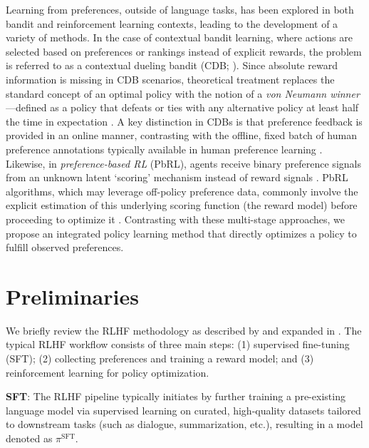 Learning from preferences, outside of language tasks, has been explored in both bandit and reinforcement learning contexts, leading to the development of a variety of methods. In the case of contextual bandit learning, where actions are selected based on preferences or rankings instead of explicit rewards, the problem is referred to as a contextual dueling bandit (CDB; \cite{yue2012karmed,dudik2015contextual}). Since absolute reward information is missing in CDB scenarios, theoretical treatment replaces the standard concept of an optimal policy with the notion of a \textit{von Neumann winner}—defined as a policy that defeats or ties with any alternative policy at least half the time in expectation \citep{dudik2015contextual}. A key distinction in CDBs is that preference feedback is provided in an online manner, contrasting with the offline, fixed batch of human preference annotations typically available in human preference learning \citep{yan2022human}. Likewise, in \textit{preference-based RL} (PbRL), agents receive binary preference signals from an unknown latent `scoring' mechanism instead of reward signals \citep{BusaFekete2014,ruiz2023dueling}. PbRL algorithms, which may leverage off-policy preference data, commonly involve the explicit estimation of this underlying scoring function (the reward model) before proceeding to optimize it \citep{jain2013learning,BusaFekete2014,christiano2017deep,sadigh2017active,kupcsik2018learning}. Contrasting with these multi-stage approaches, we propose an integrated policy learning method that directly optimizes a policy to fulfill observed preferences.

\section{Preliminaries}\label{section:prelims}

We briefly review the RLHF methodology as described by \citeauthor{ziegler2020finetuning} and expanded in \citep{stiennon2022learning, bai2022training, ouyang2022training}. The typical RLHF workflow consists of three main steps: (1) supervised fine-tuning (SFT); (2) collecting preferences and training a reward model; and (3) reinforcement learning for policy optimization.

\textbf{SFT}: The RLHF pipeline typically initiates by further training a pre-existing language model via supervised learning on curated, high-quality datasets tailored to downstream tasks (such as dialogue, summarization, etc.), resulting in a model denoted as $\pi^\text{SFT}$.

